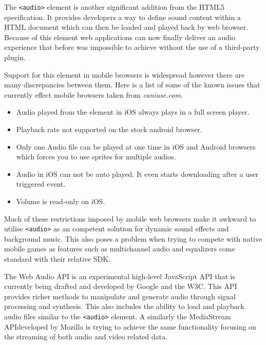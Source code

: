 \documentclass[final]{cmpreport}
\begin{document}
The \texttt{<audio>} element is another significant addition from the HTML5 specification. It provides developers a way to define sound content within a HTML document which can then be loaded and played back by web browser. Because of this element web applications can now finally deliver an audio experience that before was impossible to achieve without the use of a third-party plugin.

Support for this element in mobile browsers is widespread however there are many discrepancies between them. Here is a list of some of the known issues that currently effect mobile browsers taken from \textit{caniuse.com\footnotemark}.


\begin{itemize}
  \item Audio played from the element in iOS always plays in a full screen player.
  \item Playback rate not supported on the stock android browser.
  \item Only one Audio file can be played at one time in iOS and Android browsers which forces you to use sprites for multiple audios.
  \item Audio in iOS can not be auto played. It even starts downloading after a user triggered event.
  \item Volume is read-only on iOS.
\end{itemize}

Much of these restrictions imposed by mobile web browsers make it awkward to utilise \texttt{<audio>} as an competent solution for dynamic sound effects and background music. This also poses a problem when trying to compete with native mobile games as features such as multichannel audio and equalizers come standard with their relative SDK.

The Web Audio API is an experimental high-level JavaScript API that is currently being drafted and developed by Google and the W3C\footnotemark. This API provides richer methods to manipulate and generate audio through signal processing and synthesis. This also includes the ability to load and playback audio files similar to the \texttt{<audio>} element. A similarly the MediaStream API\footnotemark developed by Mozilla is trying to achieve the same functionality focusing on the streaming of both audio and video related data.

\end{document}
